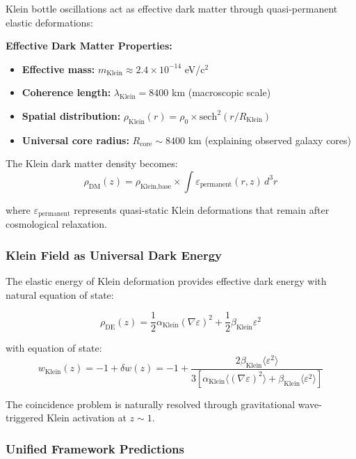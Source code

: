 \documentclass[12pt]{iopart}
\begin{document}
Klein bottle oscillations act as effective dark matter through quasi-permanent elastic deformations:

\textbf{Effective Dark Matter Properties:}
\begin{itemize}
\item \textbf{Effective mass:} $m_{\text{Klein}} \approx 2.4 \times 10^{-14}$ eV/c$^2$
\item \textbf{Coherence length:} $\lambda_{\text{Klein}} = 8400$ km (macroscopic scale)
\item \textbf{Spatial distribution:} $\rho_{\text{Klein}}(r) = \rho_0 \times \text{sech}^2(r/R_{\text{Klein}})$
\item \textbf{Universal core radius:} $R_{\text{core}} \sim 8400$ km (explaining observed galaxy cores)
\end{itemize}

The Klein dark matter density becomes:
\begin{equation}
\rho_{\text{DM}}(z) = \rho_{\text{Klein,base}} \times \int \varepsilon_{\text{permanent}}(r,z) \, d^3r
\end{equation}

where $\varepsilon_{\text{permanent}}$ represents quasi-static Klein deformations that remain after cosmological relaxation.

\subsubsection{Klein Field as Universal Dark Energy}

The elastic energy of Klein deformation provides effective dark energy with natural equation of state:

\begin{equation}
\rho_{\text{DE}}(z) = \frac{1}{2}\alpha_{\text{Klein}}(\nabla\varepsilon)^2 + \frac{1}{2}\beta_{\text{Klein}}\varepsilon^2
\end{equation}

with equation of state:
\begin{equation}
w_{\text{Klein}}(z) = -1 + \delta w(z) = -1 + \frac{2\beta_{\text{Klein}}\langle\varepsilon^2\rangle}{3[\alpha_{\text{Klein}}\langle(\nabla\varepsilon)^2\rangle + \beta_{\text{Klein}}\langle\varepsilon^2\rangle]}
\end{equation}

The coincidence problem is naturally resolved through gravitational wave-triggered Klein activation at $z \sim 1$.

\subsubsection{Unified Framework Predictions}
\end{document}
